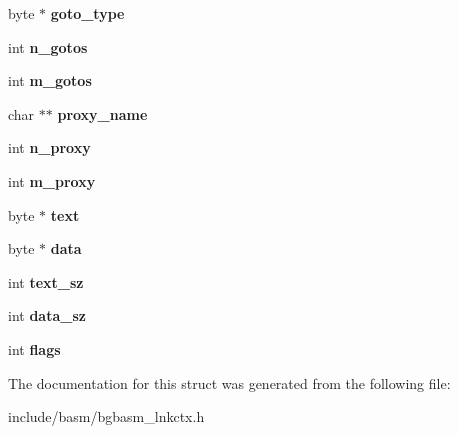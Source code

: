 \begin{DoxyCompactItemize}
\item 
\hypertarget{structBLNK__Object__s_afcb734f23a1428a57e780fd7a2bd4c8c}{byte $\ast$ {\bfseries goto\-\_\-type}}\label{structBLNK__Object__s_afcb734f23a1428a57e780fd7a2bd4c8c}

\item 
\hypertarget{structBLNK__Object__s_ad2748649b0bbdac2724c87e8a6c03f2c}{int {\bfseries n\-\_\-gotos}}\label{structBLNK__Object__s_ad2748649b0bbdac2724c87e8a6c03f2c}

\item 
\hypertarget{structBLNK__Object__s_a1df42d6e11d791538e03715f0afc7c80}{int {\bfseries m\-\_\-gotos}}\label{structBLNK__Object__s_a1df42d6e11d791538e03715f0afc7c80}

\item 
\hypertarget{structBLNK__Object__s_afd35f6cf90d36594be818f8bf0162aa8}{char $\ast$$\ast$ {\bfseries proxy\-\_\-name}}\label{structBLNK__Object__s_afd35f6cf90d36594be818f8bf0162aa8}

\item 
\hypertarget{structBLNK__Object__s_a790770280a92e9b5eb70de991570b269}{int {\bfseries n\-\_\-proxy}}\label{structBLNK__Object__s_a790770280a92e9b5eb70de991570b269}

\item 
\hypertarget{structBLNK__Object__s_a6977f6e4776f36f4daaa7491b503ce74}{int {\bfseries m\-\_\-proxy}}\label{structBLNK__Object__s_a6977f6e4776f36f4daaa7491b503ce74}

\item 
\hypertarget{structBLNK__Object__s_adaad23079fcc28ca3cc44b5cbdc5db1d}{byte $\ast$ {\bfseries text}}\label{structBLNK__Object__s_adaad23079fcc28ca3cc44b5cbdc5db1d}

\item 
\hypertarget{structBLNK__Object__s_a7d829e5d67a6540f07ebb43f1f08ed6b}{byte $\ast$ {\bfseries data}}\label{structBLNK__Object__s_a7d829e5d67a6540f07ebb43f1f08ed6b}

\item 
\hypertarget{structBLNK__Object__s_a7096083610786233f8f4f44e619dc9d5}{int {\bfseries text\-\_\-sz}}\label{structBLNK__Object__s_a7096083610786233f8f4f44e619dc9d5}

\item 
\hypertarget{structBLNK__Object__s_a10e49cb1124f03f9577a60a4902c9647}{int {\bfseries data\-\_\-sz}}\label{structBLNK__Object__s_a10e49cb1124f03f9577a60a4902c9647}

\item 
\hypertarget{structBLNK__Object__s_a8ba908e598ce3104e5bad1a8da00d7e1}{int {\bfseries flags}}\label{structBLNK__Object__s_a8ba908e598ce3104e5bad1a8da00d7e1}

\end{DoxyCompactItemize}


The documentation for this struct was generated from the following file\-:\begin{DoxyCompactItemize}
\item 
include/basm/bgbasm\-\_\-lnkctx.\-h\end{DoxyCompactItemize}
